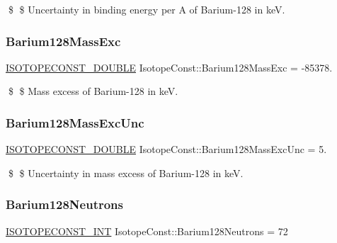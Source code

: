 \$ \$ Uncertainty in binding energy per A of Barium-\/128 in keV. \mbox{\label{group___isotope_const-_barium-_ba128_gaca66708512189c3db82108bff2cc84d9}} 
\subsubsection{\texorpdfstring{Barium128\+Mass\+Exc}{Barium128MassExc}}
{\footnotesize\ttfamily \mbox{\hyperlink{group___isotope_const-_macros_ga8f45a7272ce02c0b4c65c44636ed719a}{I\+S\+O\+T\+O\+P\+E\+C\+O\+N\+S\+T\+\_\+\+D\+O\+U\+B\+LE}} Isotope\+Const\+::\+Barium128\+Mass\+Exc = -\/85378.}

\$ \$ Mass excess of Barium-\/128 in keV. \mbox{\label{group___isotope_const-_barium-_ba128_gae2baa15dbe894d83f6721e9718d59e2a}} 
\subsubsection{\texorpdfstring{Barium128\+Mass\+Exc\+Unc}{Barium128MassExcUnc}}
{\footnotesize\ttfamily \mbox{\hyperlink{group___isotope_const-_macros_ga8f45a7272ce02c0b4c65c44636ed719a}{I\+S\+O\+T\+O\+P\+E\+C\+O\+N\+S\+T\+\_\+\+D\+O\+U\+B\+LE}} Isotope\+Const\+::\+Barium128\+Mass\+Exc\+Unc = 5.}

\$ \$ Uncertainty in mass excess of Barium-\/128 in keV. \mbox{\label{group___isotope_const-_barium-_ba128_ga19a2a60844e125ee83fcd96a125e3035}} 
\subsubsection{\texorpdfstring{Barium128\+Neutrons}{Barium128Neutrons}}
{\footnotesize\ttfamily \mbox{\hyperlink{group___isotope_const-_macros_ga5f18360b3e99483a35c32d789e62621c}{I\+S\+O\+T\+O\+P\+E\+C\+O\+N\+S\+T\+\_\+\+I\+NT}} Isotope\+Const\+::\+Barium128\+Neutrons = 72}

